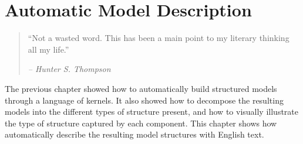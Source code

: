 
\inbpdocument


\chapter{Automatic Model Description}
\label{ch:description}












\begin{quotation}
``Not a wasted word.
This has been a main point to my literary thinking all my life.''

\hspace*{\fill} \emph{ -- Hunter S. Thompson}
\end{quotation}




The previous chapter showed how to automatically build structured models through a language of kernels.
It also showed how to decompose the resulting models into the different types of structure present, and how to visually illustrate the type of structure captured by each component.
This chapter shows how automatically describe the resulting model structures with English text.

